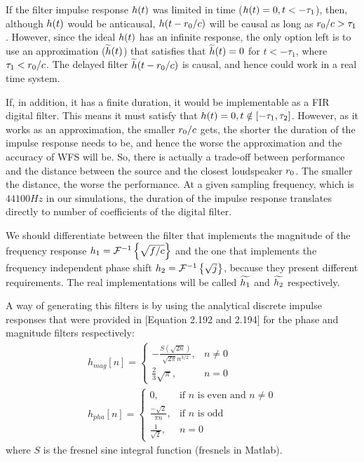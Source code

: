If the filter impulse response $\freqFilter(t)$ was limited in time ($\freqFilter(t) = 0, t < -\tau_1$), then, although $\freqFilter(t)$ would be anticausal, $\freqFilter(t - \distLinePrimSource/c)$ will be causal as long as $r_0/c > \tau_1$. However, since the ideal $\freqFilter(t)$ has an infinite response, the only option left is to use an approximation ($\widetilde{\freqFilter}(t)$) that satisfies that $\widetilde{\freqFilter}(t) = 0$ for $t < -\tau_1$, where $\tau_1 < r_0/c$. The delayed filter $\widetilde{\freqFilter}(t - \distLinePrimSource/c)$ is causal, and hence could work in a real time system.

If, in addition, it has a finite duration, it would be implementable as a FIR digital filter. This means it must satisfy that $\freqFilter(t) = 0, t \notin [-\tau_1, \tau_2]$. However, as it works as an approximation, the smaller $r_0/c$ gets, the shorter the duration of the impulse response needs to be, and hence the worse the approximation and the accuracy of WFS will be. So, there is actually a trade-off between performance and the distance between the source and the closest loudspeaker $r_0$. The smaller the distance, the worse the performance. At a given sampling frequency, which is $44100 \si{Hz}$ in our simulations, the duration of the impulse response translates directly to number of coefficients of the digital filter.

We should differentiate between the filter that implements the magnitude of the frequency response $\freqFilter[time][magnitude] = \FourierTransform{\sqrt{f/c}}[inverse]$ and the one that implements the frequency independent phase shift $\freqFilter[time][phase] = \FourierTransform{\sqrt{j}}[inverse]$, because they present different requirements. The real implementations will be called $\widetilde{\freqFilter[time][magnitude]}$ and $\widetilde{\freqFilter[time][phase]}$ respectively.

A way of generating this filters is by using the analytical discrete impulse responses that were provided in \cite{FrankSchutz2015}[Equation 2.192 and 2.194] for the phase and magnitude filters respectively:
\begin{gather}
	{h_{mag}}[n] = \begin{cases}
		-\frac{S(\sqrt{2n})}{\sqrt{2\pi}n^{3/2}}, & n \neq 0 \\
		\frac{2}{3}\sqrt{\pi}, & n = 0
	\end{cases} \\
	{h_{pha}}[n] = \begin{cases}
		0, & \text{if $n$ is even and $n \neq 0$} \\
		\frac{-\sqrt{2}}{\pi n}, & \text{if $n$ is odd} \\
		\frac{1}{\sqrt{2}}, & n = 0
	\end{cases}
\end{gather}
where $S$ is the fresnel sine integral function (fresnels in Matlab).

